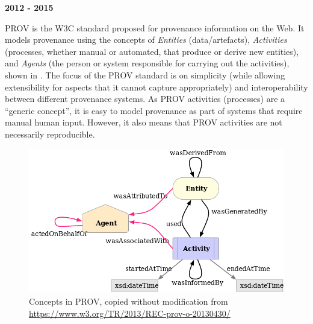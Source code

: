 
\textbf{2012 - 2015} %

PROV \cite{Moreau2015} is the W3C standard proposed for provenance information on the Web. It models provenance using the concepts of \textit{Entities} (data/artefacts), \textit{Activities} (processes, whether manual or automated, that produce or derive new entities), and \textit{Agents} (the person or system responsible for carrying out the activities), shown in . The focus of the PROV standard is on simplicity (while allowing extensibility for aspects that it cannot capture appropriately) and interoperability between different provenance systems. As PROV activities (processes) are a ``generic concept'', it is easy to model provenance as part of systems that require manual human input. However, it also means that PROV activities are not necessarily reproducible.

\begin{figure}[!h]
\centering
\includegraphics[width=\linewidth]{figs/dag/w3cprov.png}
\caption{Concepts in PROV, copied without modification from \url{https://www.w3.org/TR/2013/REC-prov-o-20130430/}}
\label{fig:prov}
\end{figure}


